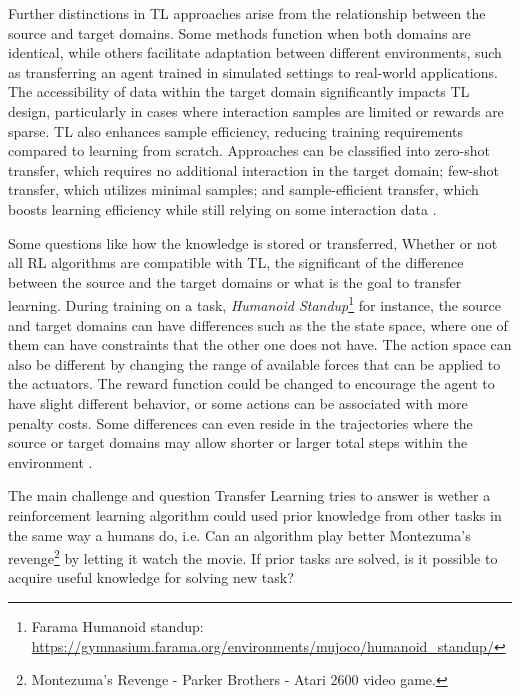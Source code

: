 Further distinctions in TL approaches arise from the relationship between the source and target domains. Some methods function when both domains are identical, while others facilitate adaptation between different environments, such as transferring an agent trained in simulated settings to real-world applications. The accessibility of data within the target domain significantly impacts TL design, particularly in cases where interaction samples are limited or rewards are sparse. TL also enhances sample efficiency, reducing training requirements compared to learning from scratch. Approaches can be classified into zero-shot transfer, which requires no additional interaction in the target domain; few-shot transfer, which utilizes minimal samples; and sample-efficient transfer, which boosts learning efficiency while still relying on some interaction data \cite{TL_survey}.

Some questions like how the knowledge is stored or transferred, Whether or not all RL algorithms are compatible with TL, the significant of the difference between the source and the target domains or what is the goal to transfer learning. During training on a task, \emph{Humanoid Standup}\footnote{Farama Humanoid standup: \url{https://gymnasium.farama.org/environments/mujoco/humanoid_standup/}} for instance, the source and target domains can have differences such as the the state space, where one of them can have constraints that the other one does not have. The action space can also be different by changing the range of available forces that can be applied to the actuators. The reward function could be changed to encourage the agent to have slight different behavior, or some actions can be associated with more penalty costs. Some differences can even reside in the trajectories where the source or target domains may allow shorter or larger total steps within the environment \cite{TL_survey}.

The main challenge and question Transfer Learning tries to answer is wether a reinforcement learning algorithm could used prior knowledge from other tasks in the same way a humans do, i.e. Can an algorithm play better Montezuma's revenge\footnote{Montezuma's Revenge - Parker Brothers - Atari 2600 video game.} by letting it watch the movie. If prior tasks are solved, is it possible to acquire useful knowledge for solving new task?

